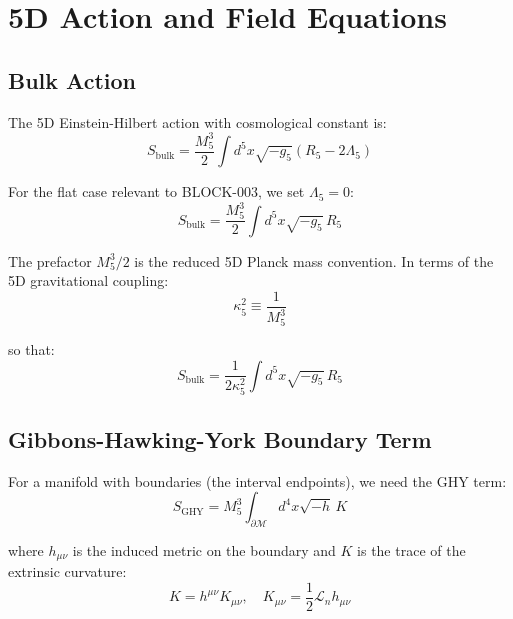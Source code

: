 \documentclass[11pt,a4paper]{article}
\newcommand{\Mfive}{M_5}
\newcommand{\kfive}{\kappa_5}
\begin{document}
\section{5D Action and Field Equations}

\subsection{Bulk Action}

The 5D Einstein-Hilbert action with cosmological constant is:
\begin{equation}
S_{\mathrm{bulk}} = \frac{\Mfive^3}{2} \int d^5x \sqrt{-g_5} \left( R_5 - 2\Lambda_5 \right)
\label{eq:bulk-action}
\end{equation}

For the flat case relevant to BLOCK-003, we set $\Lambda_5 = 0$:
\begin{equation}
S_{\mathrm{bulk}} = \frac{\Mfive^3}{2} \int d^5x \sqrt{-g_5}\, R_5
\label{eq:bulk-action-flat}
\end{equation}

The prefactor $\Mfive^3/2$ is the reduced 5D Planck mass convention. In terms of
the 5D gravitational coupling:
\begin{equation}
\kfive^2 \equiv \frac{1}{\Mfive^3}
\label{eq:kappa5-def}
\end{equation}

so that:
\begin{equation}
S_{\mathrm{bulk}} = \frac{1}{2\kfive^2} \int d^5x \sqrt{-g_5}\, R_5
\label{eq:bulk-action-kappa}
\end{equation}

\subsection{Gibbons-Hawking-York Boundary Term}

For a manifold with boundaries (the interval endpoints), we need the GHY term:
\begin{equation}
S_{\mathrm{GHY}} = \Mfive^3 \int_{\partial\mathcal{M}} d^4x \sqrt{-h}\, K
\label{eq:GHY}
\end{equation}

where $h_{\mu\nu}$ is the induced metric on the boundary and $K$ is the trace of
the extrinsic curvature:
\begin{equation}
K = h^{\mu\nu} K_{\mu\nu}, \quad K_{\mu\nu} = \frac{1}{2}\mathcal{L}_n h_{\mu\nu}
\label{eq:extrinsic-curvature}
\end{equation}
\end{document}
